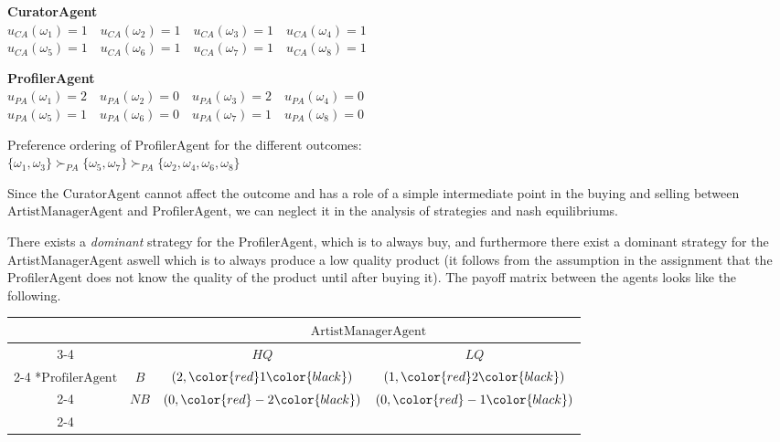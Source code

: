 \documentclass[a4paper, 11pt]{article}
\begin{document}
\begin{description}
\textbf{CuratorAgent}\\
$u_{CA}(\omega_1) = 1 \quad u_{CA}(\omega_2) = 1 \quad u_{CA}(\omega_3) = 1 \quad u_{CA}(\omega_4) = 1$ \\
$u_{CA}(\omega_5) = 1 \quad u_{CA}(\omega_6) = 1 \quad u_{CA}(\omega_7) = 1 \quad u_{CA}(\omega_8) = 1$

\textbf{ProfilerAgent}\\
$u_{PA}(\omega_1) = 2 \quad u_{PA}(\omega_2) = 0 \quad u_{PA}(\omega_3) = 2 \quad u_{PA}(\omega_4) = 0$ \\
$u_{PA}(\omega_5) = 1 \quad u_{PA}(\omega_6) = 0 \quad u_{PA}(\omega_7) = 1 \quad u_{PA}(\omega_8) = 0$

Preference ordering of ProfilerAgent for the different outcomes:\\
$\{\omega_1, \omega_3\} \succ_{PA} \{\omega_5, \omega_7\} \succ_{PA} \{\omega_2, \omega_4, \omega_6, \omega_8\}$

Since the CuratorAgent cannot affect the outcome and has a role of a simple intermediate point in the buying and selling between $\text{ArtistManagerAgent}$ and $\text{ProfilerAgent}$, we can neglect it in the analysis of strategies and nash equilibriums.

There exists a \textit{dominant} strategy for the ProfilerAgent, which is to always buy, and furthermore there exist a dominant strategy for the ArtistManagerAgent aswell which is to always produce a low quality product (it follows from the assumption in the assignment that the ProfilerAgent does not know the quality of the product until after buying it). The payoff matrix between the agents looks like the following.

\end{description}

 \begin{table}[H]
    \setlength{\extrarowheight}{2pt}
    \begin{tabular}{*{4}{c|}}
      \multicolumn{2}{c}{} & \multicolumn{2}{c}{\color{red}$\text{ArtistManagerAgent}$}\\\cline{3-4}
      \multicolumn{1}{c}{} &  & $HQ$  & $LQ$ \\\cline{2-4}
      \multirow{2}*{$\text{ProfilerAgent}$}  & $B$ & $(2,\color{red}1\color{black})$ & $(1,\color{red}2\color{black})$ \\\cline{2-4}
      & $NB$ & $(0,\color{red}-2\color{black})$ & $(0,\color{red}-1\color{black})$ \\\cline{2-4}
    \end{tabular}
  \end{table}
\end{document}
